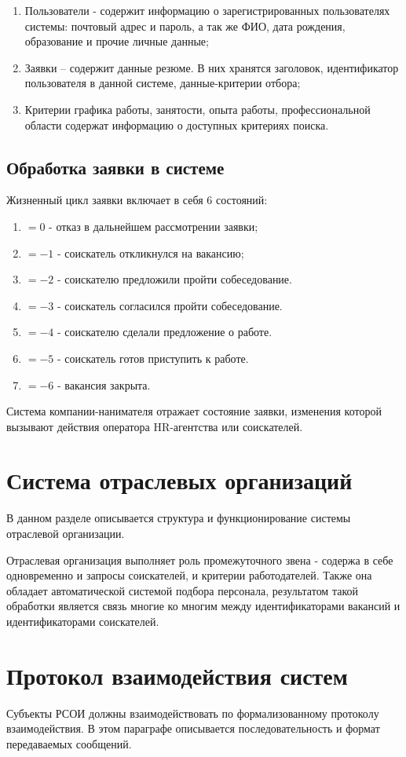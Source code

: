 \begin{enumerate}
\item Пользователи - содержит информацию о зарегистрированных пользователях системы: почтовый адрес и пароль, а так же ФИО, дата рождения, образование и прочие личные данные;
\item Заявки – содержит данные резюме. В них хранятся заголовок, идентификатор пользователя в данной системе, данные-критерии отбора;
\item Критерии графика работы, занятости, опыта работы, профессиональной области содержат информацию о доступных критериях поиска.
\end{enumerate}

\subsection{Обработка заявки в системе}
Жизненный цикл заявки включает в себя 6 состояний:
\begin{enumerate}
\item $=0$ - отказ в дальнейшем рассмотрении заявки;
\item $=-1$ - соискатель откликнулся на вакансию;
\item $=-2$ - соискателю предложили пройти собеседование.
\item $=-3$ - соискатель согласился пройти собеседование.
\item $=-4$ - соискателю сделали предложение о работе.
\item $=-5$ - соискатель готов приступить к работе.
\item $=-6$ - вакансия закрыта.
\end{enumerate}
Система компании-нанимателя отражает состояние заявки, изменения которой вызывают действия оператора HR-агентства или соискателей.

\section{Система отраслевых организаций}
В данном разделе описывается структура и функционирование системы отраслевой организации.

Отраслевая организация выполняет роль промежуточного звена - содержа в себе одновременно и запросы соискателей, и критерии работодателей. Также она обладает автоматической системой подбора персонала, результатом такой обработки является связь многие ко многим между идентификаторами вакансий и идентификаторами соискателей.


\section{Протокол взаимодействия систем}
Субъекты РСОИ должны взаимодействовать по формализованному протоколу взаимодействия. В этом параграфе описывается последовательность и формат передаваемых сообщений.

